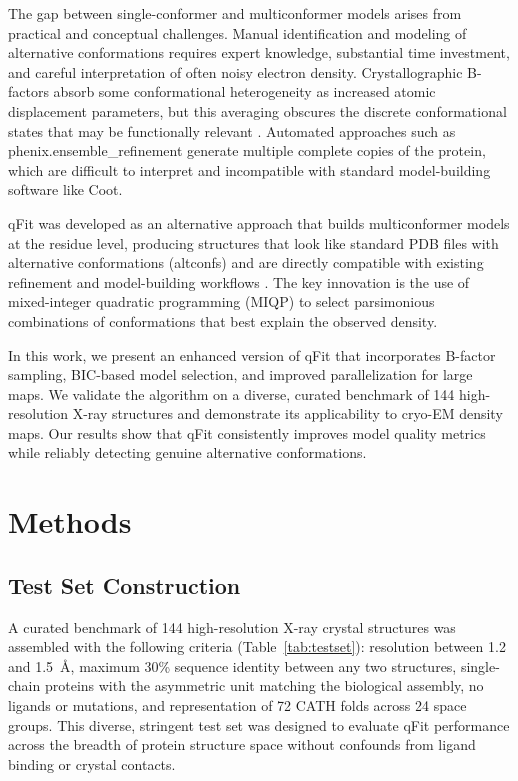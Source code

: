 \documentclass[12pt]{article}
\begin{document}
The gap between single-conformer and multiconformer models arises from practical and conceptual challenges. Manual identification and modeling of alternative conformations requires expert knowledge, substantial time investment, and careful interpretation of often noisy electron density. Crystallographic B-factors absorb some conformational heterogeneity as increased atomic displacement parameters, but this averaging obscures the discrete conformational states that may be functionally relevant \citep{fenwick2014understanding, wall2014conformational}. Automated approaches such as phenix.ensemble\_refinement \citep{burnley2012modelling} generate multiple complete copies of the protein, which are difficult to interpret and incompatible with standard model-building software like Coot.

qFit was developed as an alternative approach that builds multiconformer models at the residue level, producing structures that look like standard PDB files with alternative conformations (altconfs) and are directly compatible with existing refinement and model-building workflows \citep{keedy2015mapping, vandenbedem2015integrative}. The key innovation is the use of mixed-integer quadratic programming (MIQP) to select parsimonious combinations of conformations that best explain the observed density.

In this work, we present an enhanced version of qFit that incorporates B-factor sampling, BIC-based model selection, and improved parallelization for large maps. We validate the algorithm on a diverse, curated benchmark of 144 high-resolution X-ray structures and demonstrate its applicability to cryo-EM density maps. Our results show that qFit consistently improves model quality metrics while reliably detecting genuine alternative conformations.

\section{Methods}

\subsection{Test Set Construction}

A curated benchmark of 144 high-resolution X-ray crystal structures was assembled with the following criteria (Table~\ref{tab:testset}): resolution between 1.2 and 1.5~\AA, maximum 30\% sequence identity between any two structures, single-chain proteins with the asymmetric unit matching the biological assembly, no ligands or mutations, and representation of 72 CATH folds across 24 space groups. This diverse, stringent test set was designed to evaluate qFit performance across the breadth of protein structure space without confounds from ligand binding or crystal contacts.
\end{document}
